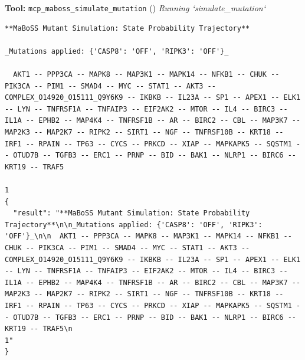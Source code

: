 \documentclass[11pt,a4paper]{article}
\begin{document}
\begin{toolokbox}
\textbf{Tool:} \texttt{mcp\_maboss\_simulate\_mutation} (\checkmark)
\textit{Running `simulate\_mutation`}
\begin{lstlisting}
**MaBoSS Mutant Simulation: State Probability Trajectory**

_Mutations applied: {'CASP8': 'OFF', 'RIPK3': 'OFF'}_

  AKT1 -- PPP3CA -- MAPK8 -- MAP3K1 -- MAPK14 -- NFKB1 -- CHUK -- PIK3CA -- PIM1 -- SMAD4 -- MYC -- STAT1 -- AKT3 -- COMPLEX_O14920_O15111_Q9Y6K9 -- IKBKB -- IL23A -- SP1 -- APEX1 -- ELK1 -- LYN -- TNFRSF1A -- TNFAIP3 -- EIF2AK2 -- MTOR -- IL4 -- BIRC3 -- IL1A -- EPHB2 -- MAP4K4 -- TNFRSF1B -- AR -- BIRC2 -- CBL -- MAP3K7 -- MAP2K3 -- MAP2K7 -- RIPK2 -- SIRT1 -- NGF -- TNFRSF10B -- KRT18 -- IRF1 -- RPAIN -- TP63 -- CYCS -- PRKCD -- XIAP -- MAPKAPK5 -- SQSTM1 -- OTUD7B -- TGFB3 -- ERC1 -- PRNP -- BID -- BAK1 -- NLRP1 -- BIRC6 -- KRT19 -- TRAF5
                                                                                                                                                                                                                                                                                                                                                                                                                                                                                                                                                                   1
{
  "result": "**MaBoSS Mutant Simulation: State Probability Trajectory**\n\n_Mutations applied: {'CASP8': 'OFF', 'RIPK3': 'OFF'}_\n\n  AKT1 -- PPP3CA -- MAPK8 -- MAP3K1 -- MAPK14 -- NFKB1 -- CHUK -- PIK3CA -- PIM1 -- SMAD4 -- MYC -- STAT1 -- AKT3 -- COMPLEX_O14920_O15111_Q9Y6K9 -- IKBKB -- IL23A -- SP1 -- APEX1 -- ELK1 -- LYN -- TNFRSF1A -- TNFAIP3 -- EIF2AK2 -- MTOR -- IL4 -- BIRC3 -- IL1A -- EPHB2 -- MAP4K4 -- TNFRSF1B -- AR -- BIRC2 -- CBL -- MAP3K7 -- MAP2K3 -- MAP2K7 -- RIPK2 -- SIRT1 -- NGF -- TNFRSF10B -- KRT18 -- IRF1 -- RPAIN -- TP63 -- CYCS -- PRKCD -- XIAP -- MAPKAPK5 -- SQSTM1 -- OTUD7B -- TGFB3 -- ERC1 -- PRNP -- BID -- BAK1 -- NLRP1 -- BIRC6 -- KRT19 -- TRAF5\n                                                                                                                                                                                                                                                                                                                                                                                                                                                                                                                                                                   1"
}
\end{lstlisting}
\end{toolokbox}
\end{document}
